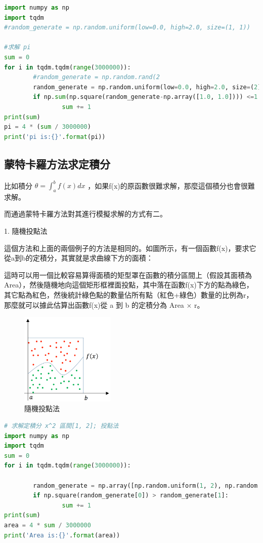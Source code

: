 \documentclass[10pt,UTF8]{ctexart}
\begin{document}
\begin{lstlisting}[language={python}]
import numpy as np
import tqdm
#random_generate = np.random.uniform(low=0.0, high=2.0, size=(1, 1))

#求解 pi
sum = 0
for i in tqdm.tqdm(range(3000000)):
        #random_generate = np.random.rand(2
        random_generate = np.random.uniform(low=0.0, high=2.0, size=(2))
        if np.sum(np.square(random_generate-np.array([1.0, 1.0]))) <=1:
                sum += 1
print(sum)
pi = 4 * (sum / 3000000)
print('pi is:{}'.format(pi))
\end{lstlisting}

\subsection{蒙特卡羅方法求定積分}

比如積分 $\theta=\int_{a}^{b} f(x) d x$ ，如果f(x)的原函數很難求解，那麼這個積分也會很難求解。

而通過蒙特卡羅方法對其進行模擬求解的方式有二。

1. 隨機投點法

這個方法和上面的兩個例子的方法是相同的。如圖所示，有一個函數f(x)，要求它從a到b的定積分，其實就是求曲線下方的面積：

這時可以用一個比較容易算得面積的矩型罩在函數的積分區間上（假設其面積為 Area），然後隨機地向這個矩形框裡面投點，其中落在函數f(x)下方的點為綠色，其它點為紅色，然後統計綠色點的數量佔所有點（紅色+綠色）數量的比例為r，那麼就可以據此估算出函數f(x)從 a 到 b 的定積分為 Area × r。

\begin{figure}[H]
\centering 
\includegraphics[width=0.40\textwidth]{w15-lab-4.png} 
\caption{隨機投點法}
\label{Test}
\end{figure}

\begin{lstlisting}[language={python}]
# 求解定積分 x^2 區間[1, 2]; 投點法
import numpy as np
import tqdm
sum = 0
for i in tqdm.tqdm(range(3000000)):

        random_generate = np.array([np.random.uniform(1, 2), np.random.uniform(0, 4)])
        if np.square(random_generate[0]) > random_generate[1]:
                sum += 1
print(sum)
area = 4 * sum / 3000000
print('Area is:{}'.format(area))
\end{lstlisting}
\end{document}
